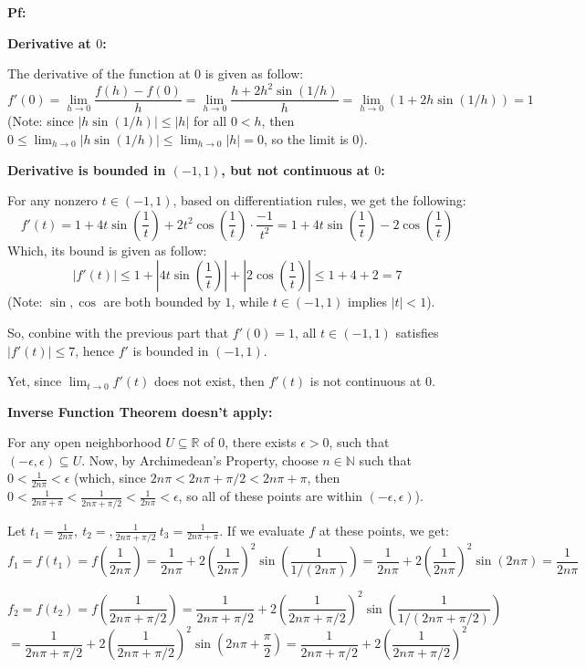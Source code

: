 \documentclass{article}
\begin{document}
\textbf{Pf:}

\textbf{Derivative at $0$:}

The derivative of the function at $0$ is given as follow:
$$f'(0)=\lim_{h\rightarrow 0}\frac{f(h)-f(0)}{h}=\lim_{h\rightarrow 0}\frac{h+2h^2\sin(1/h)}{h}=\lim_{h\rightarrow 0}(1+2h\sin(1/h))=1$$
(Note: since $|h\sin(1/h)|\leq |h|$ for all $0<h$, then $0\leq \lim_{h\rightarrow 0}|h\sin(1/h)|\leq \lim_{h\rightarrow 0}|h|=0$, so the limit is $0$).

\hfil

\textbf{Derivative is bounded in $(-1,1)$, but not continuous at $0$:}

For any nonzero $t\in (-1,1)$, based on differentiation rules, we get the following:
$$f'(t)=1+4t\sin\left(\frac{1}{t}\right) + 2t^2\cos\left(\frac{1}{t}\right)\cdot\frac{-1}{t^2} = 1+4t\sin\left(\frac{1}{t}\right)-2\cos\left(\frac{1}{t}\right)$$
Which, its bound is given as follow:
$$|f'(t)| \leq 1+\left|4t\sin\left(\frac{1}{t}\right)\right| + \left|2\cos\left(\frac{1}{t}\right)\right| \leq 1+4+2 = 7$$
(Note: $\sin,\cos$ are both bounded by $1$, while $t\in (-1,1)$ implies $|t|<1$).

So, conbine with the previous part that $f'(0)=1$, all $t\in (-1,1)$ satisfies $|f'(t)|\leq 7$, hence $f'$ is bounded in $(-1,1)$.

Yet, since $\lim_{t\rightarrow 0}f'(t)$ does not exist, then $f'(t)$ is not continuous at $0$.

\hfil

\textbf{Inverse Function Theorem doesn't apply:}

For any open neighborhood $U\subseteq \mathbb{R}$ of $0$, there exists $\epsilon>0$, such that $(-\epsilon,\epsilon)\subseteq U$. Now, by Archimedean's Property,
choose $n\in\mathbb{N}$ such that $0<\frac{1}{2n\pi}<\epsilon$ (which, since $2n\pi < 2n\pi +\pi/2 < 2n\pi +\pi$, then $0<\frac{1}{2n\pi +\pi}<\frac{1}{2n\pi +\pi/2}<\frac{1}{2n\pi}<\epsilon$, 
so all of these points are within $(-\epsilon,\epsilon)$).

Let $t_1=\frac{1}{2n\pi},\ t_2=,\frac{1}{2n\pi +\pi/2}\ t_3=\frac{1}{2n\pi+\pi}$. If we evaluate $f$ at these points, we get:
$$f_1=f(t_1)=f\left(\frac{1}{2n\pi}\right)=\frac{1}{2n\pi}+2\left(\frac{1}{2n\pi}\right)^2\sin\left(\frac{1}{1/(2n\pi)}\right)=\frac{1}{2n\pi}+2\left(\frac{1}{2n\pi}\right)^2\sin(2n\pi) = \frac{1}{2n\pi}$$

$$f_2=f(t_2) = f\left(\frac{1}{2n\pi +\pi/2}\right)=\frac{1}{2n\pi +\pi/2}+2\left(\frac{1}{2n\pi +\pi/2}\right)^2\sin\left(\frac{1}{1/(2n\pi +\pi/2)}\right)$$
$$= \frac{1}{2n\pi +\pi/2}+2\left(\frac{1}{2n\pi +\pi/2}\right)^2\sin\left(2n\pi +\frac{\pi}{2}\right)=\frac{1}{2n\pi +\pi/2}+2\left(\frac{1}{2n\pi +\pi/2}\right)^2$$
\end{document}
